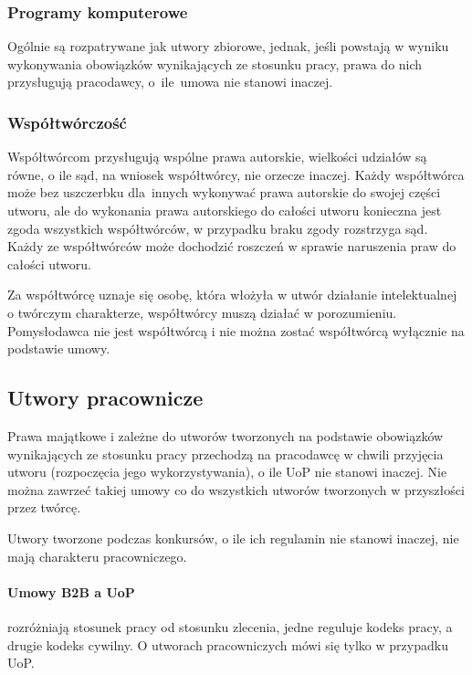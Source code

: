 \documentclass{article}
\begin{document}
\subsubsection{Programy komputerowe}

Ogólnie są rozpatrywane jak utwory zbiorowe, jednak, jeśli powstają w wyniku wykonywania obowiązków wynikających ze stosunku pracy, prawa do nich przysługują pracodawcy, o~ile~umowa nie stanowi inaczej.

\subsubsection{Współtwórczość}

Współtwórcom przysługują wspólne prawa autorskie, wielkości udziałów są równe, o ile sąd, na wniosek współtwórcy, nie orzecze inaczej.
Każdy współtwórca może bez uszczerbku dla~innych wykonywać prawa autorskie do swojej części utworu,
ale do wykonania prawa autorskiego do całości utworu konieczna jest zgoda wszystkich współtwórców, w przypadku braku zgody rozstrzyga sąd.
Każdy ze współtwórców może dochodzić roszczeń w sprawie naruszenia praw do całości utworu.

Za współtwórcę uznaje się osobę, która włożyła w utwór działanie intelektualnej o twórczym charakterze, współtwórcy muszą działać w porozumieniu.
Pomysłodawca nie jest współtwórcą i nie można zostać współtwórcą wyłącznie na podstawie umowy.

\subsection{Utwory pracownicze}

Prawa majątkowe i zależne do utworów tworzonych na podstawie obowiązków wynikających ze stosunku pracy przechodzą na pracodawcę w chwili przyjęcia utworu (rozpoczęcia jego wykorzystywania), o ile UoP nie stanowi inaczej.
Nie można zawrzeć takiej umowy co do wszystkich utworów tworzonych w przyszłości przez twórcę.

Utwory tworzone podczas konkursów, o ile ich regulamin nie stanowi inaczej, nie mają charakteru pracowniczego.

\paragraph{Umowy B2B a UoP}

rozróżniają stosunek pracy od stosunku zlecenia, jedne reguluje kodeks pracy, a drugie kodeks cywilny. O utworach pracowniczych mówi się tylko w przypadku UoP.
\end{document}
